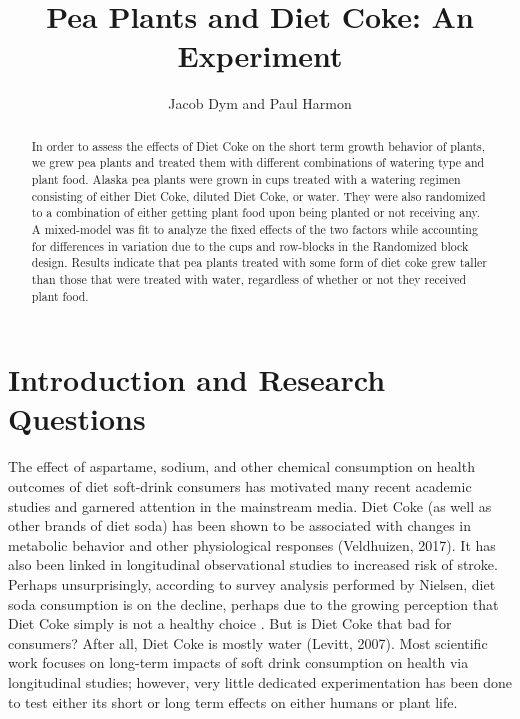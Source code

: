\documentclass[1p,12pt]{elsarticle}\usepackage[]{graphicx}\usepackage[]{color}
\begin{document}
\begin{frontmatter}


\title{Pea Plants and Diet Coke: An Experiment}

\author{Jacob Dym and Paul Harmon}

\address{Montana State University}

\begin{abstract}
In order to assess the effects of Diet Coke on the short term growth behavior of plants, we grew pea plants and treated them with different combinations of watering type and plant food. Alaska pea plants were grown in cups treated with a watering regimen consisting of either Diet Coke, diluted Diet Coke, or water. They were also randomized to a combination of either getting plant food upon being planted or not receiving any. A mixed-model was fit to analyze the fixed effects of the two factors while accounting for differences in variation due to the cups and row-blocks in the Randomized block design. Results indicate that pea plants treated with some form of diet coke grew taller than those that were treated with water, regardless of whether or not they received plant food. 
\end{abstract}


\end{frontmatter}



\section{Introduction and Research Questions}

The effect of aspartame, sodium, and other chemical consumption on health outcomes of diet soft-drink consumers has motivated many recent academic studies and garnered attention in the mainstream media. Diet Coke (as well as other brands of diet soda) has been shown to be associated with changes in metabolic behavior and other physiological responses (Veldhuizen, 2017). It has also been linked in longitudinal observational studies to increased risk of stroke. Perhaps unsurprisingly, according to survey analysis performed by Nielsen, diet soda consumption is on the decline, perhaps due to the growing perception that Diet Coke simply is not a healthy choice . But is Diet Coke that bad for consumers? After all, Diet Coke is mostly water (Levitt, 2007). Most scientific work focuses on long-term impacts of soft drink consumption on health via longitudinal studies; however, very little dedicated experimentation has been done to test either its short or long term effects on either humans or plant life. 
\end{document}
